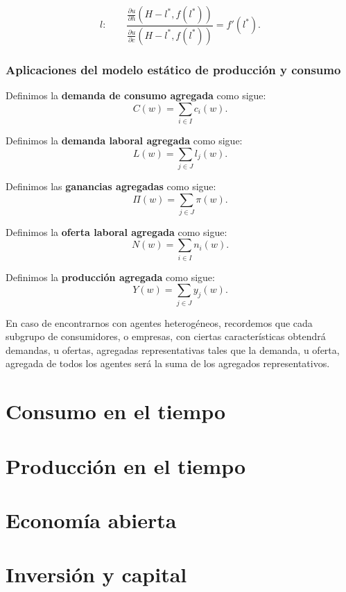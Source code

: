 \documentclass[8pt,a4paper]{extarticle}
\begin{document}
\begin{multicols}{3}
\[
	l: \qquad \frac{\displaystyle \frac{\partial u}{\partial h} (H - l^*, f(l^*)) }{\displaystyle \frac{\partial u}{\partial c} (H - l^*, f(l^*))} = f'(l^*)
.\] 

\sectionbreak

\section{Aplicaciones del modelo estático de producción y consumo}

\begin{boxdef}
	Definimos la \textbf{demanda de consumo agregada} como sigue:
	\[
		C(w) = \sum_{i \in I} c_i(w)
	.\] 
\end{boxdef}

\begin{boxdef}
	Definimos la \textbf{demanda laboral agregada} como sigue:
	\[
		L(w) = \sum_{j \in J} l_j(w)
	.\] 
\end{boxdef}

\begin{boxdef}
	Definimos las \textbf{ganancias agregadas} como sigue:
	\[
		\Pi(w) = \sum_{j \in J} \pi(w)
	.\] 
\end{boxdef}

\begin{boxdef}
	Definimos la \textbf{oferta laboral agregada} como sigue:
	\[
		N(w) = \sum_{i \in I} n_i(w)
	.\] 
\end{boxdef}

\begin{boxdef}
	Definimos la \textbf{producción agregada} como sigue:
	\[
		Y(w) = \sum_{j \in J} y_j(w)
	.\] 
\end{boxdef}

En caso de encontrarnos con agentes heterogéneos, recordemos que cada subgrupo de consumidores, o empresas, con ciertas características obtendrá demandas, u ofertas, agregadas representativas tales que la demanda, u oferta, agregada de todos los agentes será la suma de los agregados representativos.

\newpage

\part{Consumo en el tiempo}

\newpage

\part{Producción en el tiempo}

\newpage

\part{Economía abierta}

\newpage

\part{Inversión y capital}

\vfill\eject
\columnbreak
\end{multicols}
\end{document}
